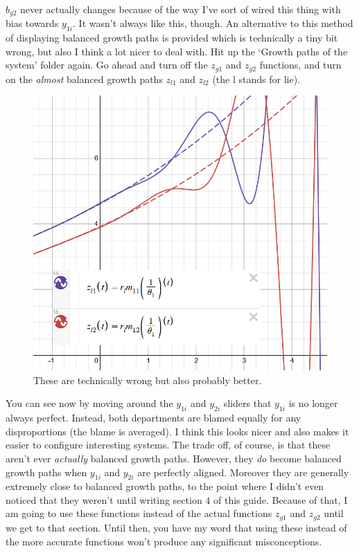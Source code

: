 \documentclass{article}
\theoremstyle{theorem}
\begin{document}
$b_{g2}$ never actually changes because of the way I've sort of wired this thing with bias towards $y_{1i}$. It wasn't always like this, though. An alternative to this method of displaying balanced growth paths is provided which is technically a tiny bit wrong, but also I think a lot nicer to deal with. Hit up the `Growth paths of the system' folder again. Go ahead and turn off the $z_{g1}$ and $z_{g2}$ functions, and turn on the \emph{almost} balanced growth paths $z_{l1}$ and $z_{l2}$ (the l stands for lie). \par 
\begin{figure}[H]
\centering
\includegraphics[scale=.7]{Images/almostBalancedGrowth}
\caption{These are technically wrong but also probably better.}
\end{figure}
You can see now by moving around the $y_{1i}$ and $y_{2i}$ sliders that $y_{1i}$ is no longer always perfect. Instead, both departments are blamed equally for any disproportions (the blame is averaged). I think this looks nicer and also makes it easier to configure interesting systems. The trade off, of course, is that these aren't ever \emph{actually} balanced growth paths. However, they \emph{do} become balanced growth paths when $y_{1i}$ and $y_{2i}$ are perfectly aligned. Moreover they are generally extremely close to balanced growth paths, to the point where I didn't even noticed that they weren't until writing section $4$ of this guide. Because of that, I am going to use these functions instead of the actual functions $z_{g1}$ and $z_{g2}$ until we get to that section. Until then, you have my word that using these instead of the more accurate functions won't produce any significant misconceptions. \par 
\end{document}
